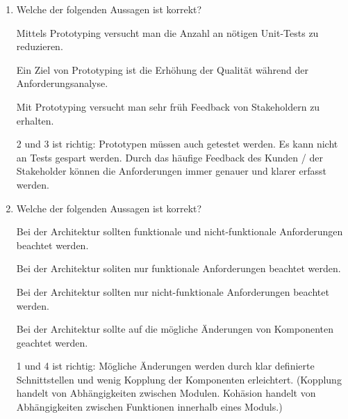 \documentclass{bschlangaul-aufgabe}
\begin{document}
\begin{enumerate}

\item Welche der folgenden Aussagen ist korrekt?

\begin{itemize}
\bCheckboxLeer Mittels Prototyping versucht man die
Anzahl an nötigen Unit-Tests zu reduzieren.

\bCheckboxLeer Ein Ziel von Prototyping ist die Erhöhung der Qualität
während der Anforderungsanalyse.

\bCheckboxLeer Mit Prototyping versucht man sehr früh Feedback von
Stakeholdern zu erhalten.
\end{itemize}

\begin{bAntwort}
2 und 3 ist richtig: Prototypen müssen auch getestet werden. Es kann
nicht an Tests gespart werden. Durch das häufige Feedback des Kunden /
der Stakeholder können die Anforderungen immer genauer und klarer
erfasst werden.
\end{bAntwort}


\item Welche der folgenden Aussagen ist korrekt?

\begin{itemize}
\bCheckboxLeer Bei der Architektur sollten funktionale und nicht-funktionale
Anforderungen beachtet werden.

\bCheckboxLeer Bei der Architektur soliten nur funktionale Anforderungen
beachtet werden.

\bCheckboxLeer Bei der Architektur sollten nur nicht-funktionale
Anforderungen beachtet werden.

\bCheckboxLeer Bei der Architektur sollte auf die mögliche Änderungen
von Komponenten geachtet werden.
\end{itemize}

\begin{bAntwort}
1 und 4 ist richtig: Mögliche Änderungen werden durch klar definierte
Schnittstellen und wenig Kopplung der Komponenten erleichtert. (Kopplung
handelt von Abhängigkeiten zwischen Modulen. Kohäsion handelt von
Abhängigkeiten zwischen Funktionen innerhalb eines Moduls.)
\end{bAntwort}
\end{enumerate}
\end{document}

